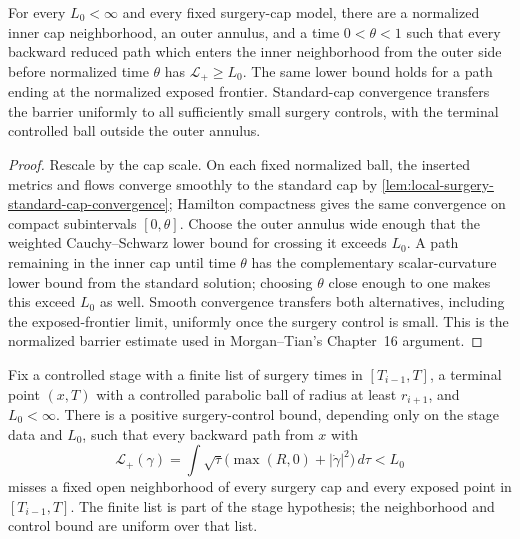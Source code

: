 \begin{lemma}
\label{lem:standard-cap-reduced-length-barrier}
\notready
For every $L_0<\infty$ and every fixed surgery-cap model, there are a
normalized inner cap neighborhood, an outer annulus, and a time
$0<\theta<1$ such that every backward reduced path which enters the inner
neighborhood from the outer side before normalized time $\theta$ has
$\mathcal L_+\ge L_0$.  The same lower bound holds for a path ending at the
normalized exposed frontier.  Standard-cap convergence transfers the barrier
uniformly to all sufficiently small surgery controls, with the terminal
controlled ball outside the outer annulus.
\end{lemma}

\begin{proof}
Rescale by the cap scale.  On each fixed normalized ball, the inserted metrics
and flows converge smoothly to the standard cap by
\ref{lem:local-surgery-standard-cap-convergence}; Hamilton compactness gives
the same convergence on compact subintervals $[0,\theta]$.  Choose the outer
annulus wide enough that the weighted Cauchy--Schwarz lower bound for crossing
it exceeds $L_0$.  A path remaining in the inner cap until time $\theta$ has
the complementary scalar-curvature lower bound from the standard solution;
choosing $\theta$ close enough to one makes this exceed $L_0$ as well.  Smooth
convergence transfers both alternatives, including the exposed-frontier
limit, uniformly once the surgery control is small.  This is the normalized
barrier estimate used in Morgan--Tian's Chapter~16 argument.
\end{proof}

\begin{lemma}
\label{lem:short-reduced-paths-avoid-surgery-caps}
\notready
Fix a controlled stage with a finite list of surgery times in
$[T_{i-1},T]$, a terminal point $(x,T)$ with a controlled parabolic ball of
radius at least $r_{i+1}$, and $L_0<\infty$.  There is a
positive surgery-control bound, depending only on the stage data and $L_0$,
such that every backward path from $x$ with
\[
 \mathcal L_+(\gamma)=\int\sqrt\tau
   \bigl(\max(R,0)+|\dot\gamma|^2\bigr)\,d\tau<L_0
\]
misses a fixed open neighborhood of every surgery cap and every exposed
point in $[T_{i-1},T]$.  The finite list is part of the stage hypothesis; the
neighborhood and control bound are uniform over that list.
\end{lemma}

